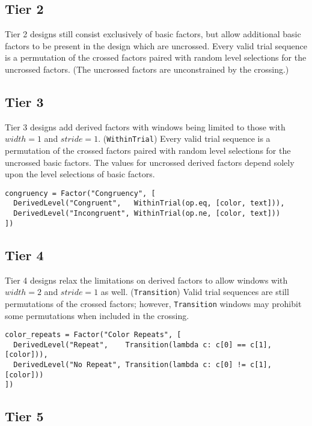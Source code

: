 \subsection{Tier 2}

Tier 2 designs still consist exclusively of basic factors, but allow additional basic factors to be present in the design which are uncrossed. Every valid trial sequence is a permutation of the crossed factors paired with random level selections for the uncrossed factors. (The uncrossed factors are unconstrained by the crossing.)

\subsection{Tier 3}

Tier 3 designs add derived factors with windows being limited to those with $width=1$ and $stride=1$. (\texttt{WithinTrial}) Every valid trial sequence is a permutation of the crossed factors paired with random level selections for the uncrossed basic factors. The values for uncrossed derived factors depend solely upon the level selections of basic factors.

\begin{verbatim}
congruency = Factor("Congruency", [
  DerivedLevel("Congruent",   WithinTrial(op.eq, [color, text])),
  DerivedLevel("Incongruent", WithinTrial(op.ne, [color, text]))
])
\end{verbatim}

\subsection{Tier 4}

Tier 4 designs relax the limitations on derived factors to allow windows with $width=2$ and $stride=1$ as well. (\texttt{Transition}) Valid trial sequences are still permutations of the crossed factors; however, \texttt{Transition} windows may prohibit some permutations when included in the crossing.

\begin{verbatim}
color_repeats = Factor("Color Repeats", [
  DerivedLevel("Repeat",    Transition(lambda c: c[0] == c[1], [color])),
  DerivedLevel("No Repeat", Transition(lambda c: c[0] != c[1], [color]))
])
\end{verbatim}

\subsection{Tier 5}


